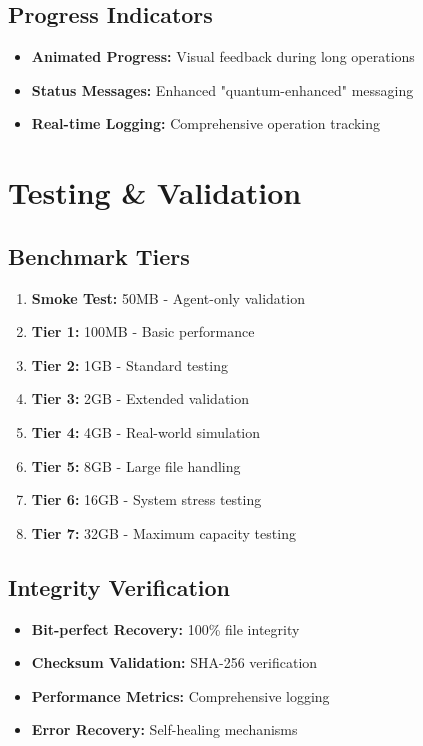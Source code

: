 \documentclass[12pt,a4paper]{article}
\begin{document}
\subsection{Progress Indicators}
\begin{itemize}
    \item \textbf{Animated Progress:} Visual feedback during long operations
    \item \textbf{Status Messages:} Enhanced "quantum-enhanced" messaging
    \item \textbf{Real-time Logging:} Comprehensive operation tracking
\end{itemize}

\section{Testing \& Validation}

\subsection{Benchmark Tiers}
\begin{enumerate}
    \item \textbf{Smoke Test:} 50MB - Agent-only validation
    \item \textbf{Tier 1:} 100MB - Basic performance
    \item \textbf{Tier 2:} 1GB - Standard testing
    \item \textbf{Tier 3:} 2GB - Extended validation
    \item \textbf{Tier 4:} 4GB - Real-world simulation
    \item \textbf{Tier 5:} 8GB - Large file handling
    \item \textbf{Tier 6:} 16GB - System stress testing
    \item \textbf{Tier 7:} 32GB - Maximum capacity testing
\end{enumerate}

\subsection{Integrity Verification}
\begin{itemize}
    \item \textbf{Bit-perfect Recovery:} 100\% file integrity
    \item \textbf{Checksum Validation:} SHA-256 verification
    \item \textbf{Performance Metrics:} Comprehensive logging
    \item \textbf{Error Recovery:} Self-healing mechanisms
\end{itemize}
\end{document}
